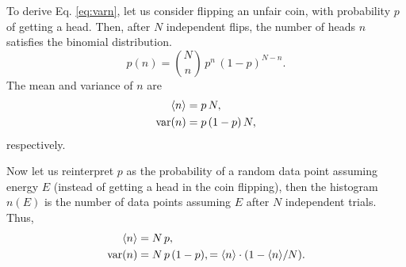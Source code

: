 \documentclass[aip,jcp,preprint,superscriptaddress]{revtex4-1}
\begin{document}
To derive Eq. \eqref{eq:varn},
let us consider flipping an unfair coin,
with probability $p$ of getting a head.
%
Then, after $N$ independent flips,
the number of heads $n$ satisfies the binomial distribution.
%
\begin{equation}
  p(n) = {N \choose n} \, p^n \, (1 - p)^{N - n}.
  \label{eq:binomial}
\end{equation}
%
The mean and variance of $n$ are
%
\begin{align}
  \langle n \rangle &= p \, N, \\
  \mathrm{var}(n) &= p \, (1 - p) \, N,
  \label{eq:binomial_moments}
\end{align}
respectively.



Now let us reinterpret $p$ as
the probability of a random data point
assuming energy $E$ (instead of getting a head in the coin flipping),
then the histogram $n(E)$ is the number
of data points assuming $E$ after $N$ independent trials.
%
Thus,
%
\begin{align*}
\langle n \rangle
&=
N \, p,
\\
\mathrm{var}(n)
&=
N \, p \, (1 - p),
=
\langle n \rangle \cdot ( 1 - \langle n \rangle/N).
\end{align*}











\end{document}
